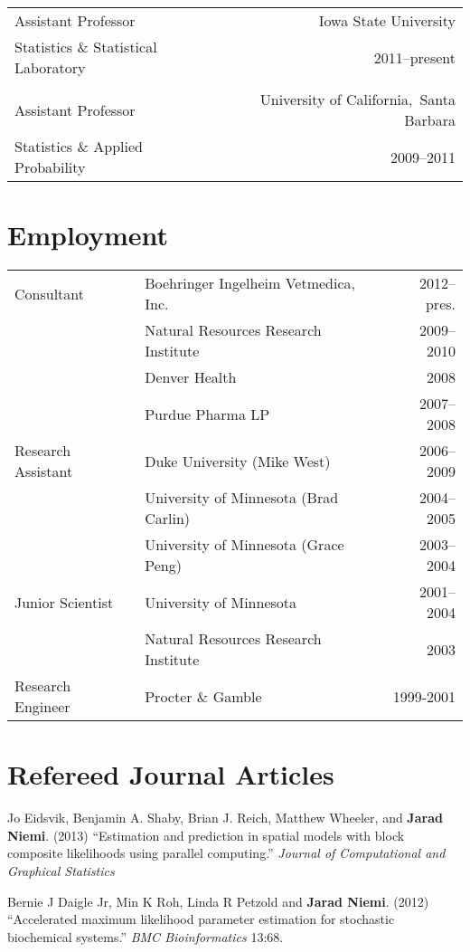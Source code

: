 \documentclass[overlapped,line]{res}
\begin{document}
\begin{resume}
\begin{tabular}{l@{\qquad}r}
Assistant Professor & Iowa State University \\
Statistics \& Statistical Laboratory & 2011--present \\
\\
Assistant Professor & University of California,\ Santa Barbara \\
Statistics \& Applied Probability & 2009--2011
\end{tabular}


\section{\bf Employment}

\begin{tabular}{l@{\qquad}l@{\qquad}r}
Consultant & Boehringer Ingelheim Vetmedica, Inc. & 2012--pres. \\
 & Natural Resources Research Institute  & 2009--2010 \\
 & Denver Health & 2008 \\
 & Purdue Pharma LP & 2007--2008 \\
Research Assistant & Duke University (Mike West) & 2006--2009 \\
 & University of Minnesota (Brad Carlin) & 2004--2005 \\
 & University of Minnesota (Grace Peng) & 2003--2004 \\
Junior Scientist & University of Minnesota & 2001--2004 \\
 & Natural Resources Research Institute & 2003 \\
Research Engineer & Procter \& Gamble & 1999-2001
\end{tabular}


\section{\bf Refereed Journal Articles}

Jo Eidsvik, Benjamin A. Shaby, Brian J. Reich, Matthew Wheeler, and {\bf Jarad Niemi}. (2013) ``Estimation and prediction in spatial models with block composite likelihoods using parallel computing.'' \emph{Journal of Computational and Graphical Statistics}

Bernie J Daigle Jr, Min K Roh, Linda R Petzold and {\bf Jarad Niemi}. (2012) ``Accelerated maximum likelihood parameter estimation for stochastic biochemical systems.'' \emph{BMC Bioinformatics} 13:68.


\end{resume}
\end{document}
